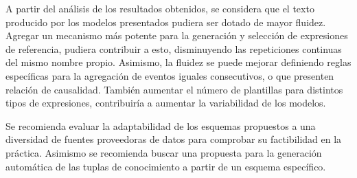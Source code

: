 \begin{recomendations}

   A partir del análisis de los resultados obtenidos, se considera que el texto producido por los 
modelos presentados pudiera ser dotado de mayor fluidez. Agregar un mecanismo más potente
para la generaci\'on y selección de expresiones de referencia, pudiera contribuir
a esto, disminuyendo las repeticiones continuas del mismo nombre propio. Asimismo, la fluidez se puede mejorar definiendo reglas 
específicas para la agregación de eventos iguales consecutivos, o que presenten relación de causalidad.
También aumentar el número de plantillas para distintos tipos de expresiones, 
contribuiría a aumentar la variabilidad de los modelos.

Se recomienda evaluar la adaptabilidad de los esquemas propuestos a una diversidad de fuentes proveedoras de datos para comprobar su 
factibilidad en la práctica. Asimismo se recomienda buscar una propuesta para la generación automática de las tuplas de 
conocimiento a partir de un esquema específico. 
 



\end{recomendations}
